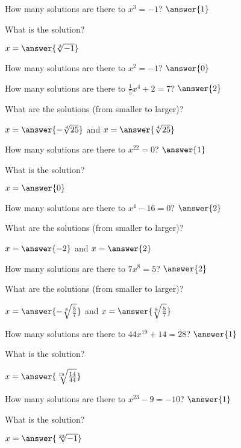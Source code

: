 \documentclass{ximera}
\author{Kenneth Berglund}
\begin{document}
\begin{exercise}
How many solutions are there to $x^3=-1$? $\answer{1}$
\begin{exercise}
What is the solution?

$x=\answer{\sqrt[3]{-1}}$
\end{exercise}
\end{exercise}

\begin{exercise}
How many solutions are there to $x^2=-1$? $\answer{0}$
\end{exercise}

\begin{exercise}
How many solutions are there to $\frac{1}{5}x^4+2=7$? $\answer{2}$
\begin{exercise}
What are the solutions (from smaller to larger)?

$x=\answer{-\sqrt[4]{25}}$ and $x=\answer{\sqrt[4]{25}}$ 
\end{exercise}
\end{exercise}

\begin{exercise}
How many solutions are there to $x^{22}=0$? $\answer{1}$
\begin{exercise}
What is the solution?

$x=\answer{0}$ 
\end{exercise}
\end{exercise}

\begin{exercise}
How many solutions are there to $x^4-16=0$? $\answer{2}$
\begin{exercise}
What are the solutions (from smaller to larger)?

$x=\answer{-2}$ and $x = \answer{2}$
\end{exercise}
\end{exercise}

\begin{exercise}
How many solutions are there to $7x^8=5$? $\answer{2}$
\begin{exercise}
What are the solutions (from smaller to larger)?

$x=\answer{-\sqrt[8]{\frac{5}{7}}}$ and $x=\answer{\sqrt[8]{\frac{5}{7}}}$
\end{exercise}
\end{exercise}

\begin{exercise}
How many solutions are there to $44x^{19}+14=28$? $\answer{1}$
\begin{exercise}
What is the solution?

$x=\answer{\sqrt[19]{\frac{14}{44}}}$
\end{exercise}
\end{exercise}

\begin{exercise}
How many solutions are there to $x^{23} -9=-10$? $\answer{1}$
\begin{exercise}
What is the solution?

$x=\answer{\sqrt[23]{-1}}$
\end{exercise}
\end{exercise}
\end{document}
